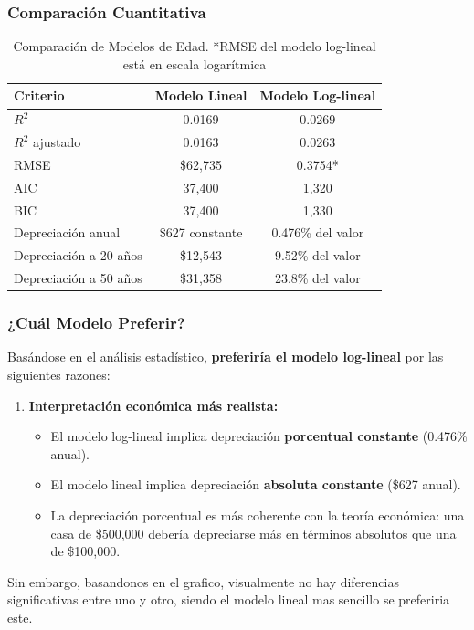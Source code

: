 \documentclass[12pt]{article}
\begin{document}
\subsubsection*{Comparación Cuantitativa}

\begin{table}[h]
\centering
\begin{tabular}{lcc}
\hline
\textbf{Criterio} & \textbf{Modelo Lineal} & \textbf{Modelo Log-lineal} \\
\hline
$R^2$ & 0.0169 & 0.0269 \\
$R^2$ ajustado & 0.0163 & 0.0263 \\
RMSE & \$62,735 & 0.3754* \\
AIC & 37,400 & 1,320 \\
BIC & 37,400 & 1,330 \\
\hline
Depreciación anual & \$627 constante & 0.476\% del valor \\
Depreciación a 20 años & \$12,543 & 9.52\% del valor \\
Depreciación a 50 años & \$31,358 & 23.8\% del valor \\
\hline
\end{tabular}
\caption{Comparación de Modelos de Edad. *RMSE del modelo log-lineal está en escala logarítmica}
\label{tab:age_comparison}
\end{table}

\subsubsection*{¿Cuál Modelo Preferir?}

Basándose en el análisis estadístico, \textbf{preferiría el modelo log-lineal} por las siguientes razones:

\begin{enumerate}
    
    \item \textbf{Interpretación económica más realista:}
    \begin{itemize}
        \item El modelo log-lineal implica depreciación \textbf{porcentual constante} (0.476\% anual).
        \item El modelo lineal implica depreciación \textbf{absoluta constante} (\$627 anual).
        \item La depreciación porcentual es más coherente con la teoría económica: una casa de \$500,000 debería depreciarse más en términos absolutos que una de \$100,000.
    \end{itemize}
\end{enumerate}

Sin embargo, basandonos en el grafico, visualmente no hay diferencias significativas entre uno y otro, siendo el modelo lineal mas sencillo se  preferiria este.
\end{document}
